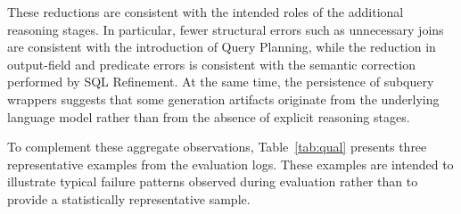 \documentclass{svproc}
\begin{document}
These reductions are consistent with the intended roles of the additional reasoning stages. In particular, fewer structural errors such as unnecessary joins are consistent with the introduction of Query Planning, while the reduction in output-field and predicate errors is consistent with the semantic correction performed by SQL Refinement. At the same time, the persistence of subquery wrappers suggests that some generation artifacts originate from the underlying language model rather than from the absence of explicit reasoning stages.





To complement these aggregate observations, Table~\ref{tab:qual} presents three representative examples from the evaluation logs. These examples are intended to illustrate typical failure patterns observed during evaluation rather than to provide a statistically representative sample.
\end{document}
